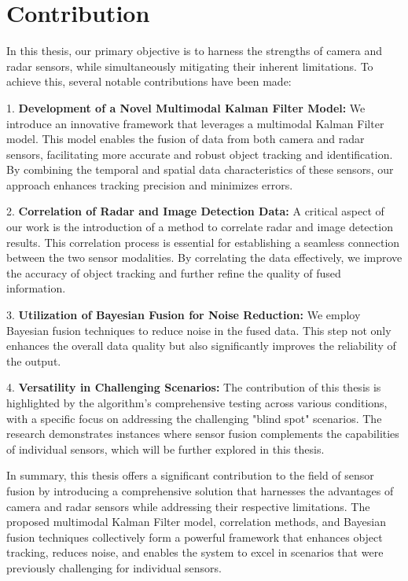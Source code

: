 \section{Contribution}\label{sec:1-contribution}


In this thesis, our primary objective is to harness the strengths of camera and radar sensors, 
while simultaneously mitigating their inherent limitations. To achieve this, several notable contributions have been made:

1. \textbf{Development of a Novel Multimodal Kalman Filter Model: }
We introduce an innovative framework that leverages a multimodal Kalman Filter model. 
This model enables the fusion of data from both camera and radar sensors, 
facilitating more accurate and robust object tracking and identification. 
By combining the temporal and spatial data characteristics of these sensors, 
our approach enhances tracking precision and minimizes errors.

2. \textbf{Correlation of Radar and Image Detection Data: }
A critical aspect of our work is the introduction of a method to correlate radar and image detection results. 
This correlation process is essential for establishing a seamless connection between the two sensor modalities.
By correlating the data effectively, we improve the accuracy of object tracking and further refine the quality of fused information.

3. \textbf{Utilization of Bayesian Fusion for Noise Reduction: }
We employ Bayesian fusion techniques to reduce noise in the fused data.
This step not only enhances the overall data quality but also significantly improves the reliability of the output. 

4. \textbf{Versatility in Challenging Scenarios: }
The contribution of this thesis is highlighted by the algorithm's comprehensive testing across various conditions, 
with a specific focus on addressing the challenging "blind spot" scenarios. 
The research demonstrates instances where sensor fusion complements the capabilities of individual sensors, 
which will be further explored in this thesis.


In summary, this thesis offers a significant contribution to the field of sensor fusion by introducing a comprehensive solution 
that harnesses the advantages of camera and radar sensors while addressing their respective limitations.
 The proposed multimodal Kalman Filter model, correlation methods, and Bayesian fusion techniques collectively form 
 a powerful framework that enhances object tracking, reduces noise, and enables the system to excel in scenarios that were previously challenging for individual sensors.

